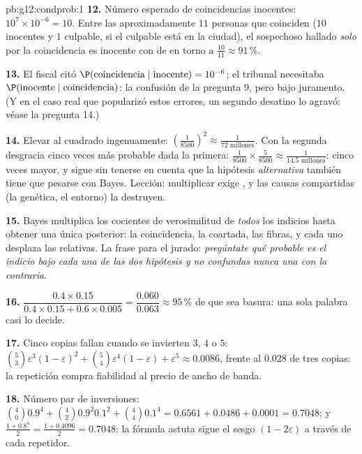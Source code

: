 \begin{solution}{pb:g12:condprob:1}
\textbf{12.} Número esperado de coincidencias inocentes:
$10^7 \times 10^{-6} = 10$. Entre las aproximadamente $11$ personas que
coinciden ($10$ inocentes y $1$ culpable, si el culpable está en la
ciudad), el sospechoso hallado \emph{solo} por la coincidencia es inocente
con  de en torno a $\frac{10}{11} \approx 91\,\%$.

\textbf{13.} El fiscal citó
$\P(\text{coincidencia} \mid \text{inocente}) = 10^{-6}$; el tribunal
necesitaba $\P(\text{inocente} \mid \text{coincidencia})$: la confusión de
la pregunta 9, pero bajo juramento. (Y en el caso real que popularizó estos
errores, un segundo desatino lo agravó: véase la pregunta 14.)

\textbf{14.} Elevar al cuadrado ingenuamente:
$\left(\frac{1}{8500}\right)^2 \approx \frac{1}{72 \text{ millones}}$. Con
la segunda desgracia cinco veces más probable dada la primera:
$\frac{1}{8500} \times \frac{5}{8500} \approx
\frac{1}{14.5 \text{ millones}}$: cinco veces mayor, y sigue sin tenerse en
cuenta que la hipótesis \emph{alternativa} también tiene que pesarse con
Bayes. Lección: multiplicar  exige , y las
causas compartidas (la genética, el entorno) la destruyen.

\textbf{15.} Bayes multiplica los cocientes de verosimilitud de
\emph{todos} los indicios hasta obtener una única  posterior:
la coincidencia, la coartada, las fibras, y cada uno desplaza las
 relativas. La frase para el jurado: \emph{pregúntate qué
probable es el indicio bajo cada una de las dos hipótesis y no confundas
nunca una  con la contraria}.

\textbf{16.} $\dfrac{0.4 \times 0.15}{0.4 \times 0.15 +
0.6 \times 0.005} = \dfrac{0.060}{0.063} \approx 95\,\%$ de que sea
basura: una sola palabra casi lo decide.

\textbf{17.} Cinco copias fallan cuando se invierten $3$, $4$ o $5$:
$\binom53 \varepsilon^3(1-\varepsilon)^2 + \binom54
\varepsilon^4 (1 - \varepsilon) + \varepsilon^5 \approx 0.0086$, frente al
$0.028$ de tres copias: la repetición compra fiabilidad al precio de ancho
de banda.

\textbf{18.} Número par de inversiones:
$\binom40 0.9^4 + \binom42 0.9^2 0.1^2 + \binom44 0.1^4
= 0.6561 + 0.0486 + 0.0001 = 0.7048$; y
$\frac{1 + 0.8^4}{2} = \frac{1 + 0.4096}{2} = 0.7048$: la fórmula astuta
sigue el sesgo $(1 - 2\varepsilon)$ a través de cada repetidor.


\end{solution}
